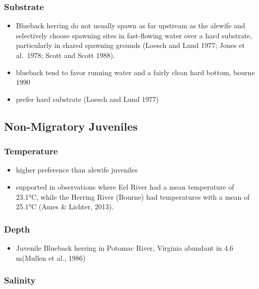 \documentclass[
]{book}
\providecommand{\tightlist}{%
  \setlength{\itemsep}{0pt}\setlength{\parskip}{0pt}}
\begin{document}
\hypertarget{substrate-3}{%
\subsubsection{Substrate}\label{substrate-3}}

\begin{itemize}
\item
  Blueback herring do not usually spawn as far upstream as the alewife and selectively choose spawning sites in fast-flowing water over a hard substrate, particularly in shared spawning grounds (Loesch and Lund 1977; Jones et al.~1978; Scott and Scott 1988).
\item
  blueback tend to favor running water and a fairly clean hard bottom, bourne 1990
\item
  prefer hard substrate (Loesch and Lund 1977)
\end{itemize}

\hypertarget{non-migratory-juveniles-2}{%
\subsection{Non-Migratory Juveniles}\label{non-migratory-juveniles-2}}

\hypertarget{temperature-4}{%
\subsubsection{Temperature}\label{temperature-4}}

\begin{itemize}
\item
  higher preference than alewife juveniles
\item
  supported in observations where Eel River had a mean temperature of 23.1°C, while the Herring River (Bourne) had temperatures with a mean of 25.1°C (Ames \& Lichter, 2013).
\end{itemize}

\hypertarget{depth-4}{%
\subsubsection{Depth}\label{depth-4}}

\begin{itemize}
\tightlist
\item
  Juvenile Blueback herring in Potomac River, Virginia abundant in 4.6 m(Mullen et al., 1986)
\end{itemize}

\hypertarget{salinity-4}{%
\subsubsection{Salinity}\label{salinity-4}}
\end{document}
